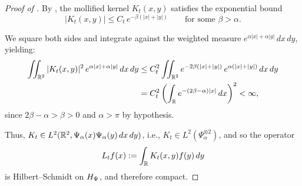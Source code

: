 \begin{proof}[Proof of ]
By , the mollified kernel \( K_t(x,y) \) satisfies the exponential bound
\[
|K_t(x,y)| \leq C_t \, e^{-\beta(|x| + |y|)} \qquad \text{for some } \beta > \alpha.
\]

We square both sides and integrate against the weighted measure \( e^{\alpha|x| + \alpha|y|}\, dx\, dy \), yielding:
\[
\begin{aligned}
\iint_{\mathbb{R}^2} |K_t(x,y)|^2\, e^{\alpha|x| + \alpha|y|}\, dx\, dy
&\le C_t^2 \iint_{\mathbb{R}^2} e^{-2\beta(|x| + |y|)}\, e^{\alpha(|x| + |y|)}\, dx\, dy \\
&= C_t^2 \left( \int_{\mathbb{R}} e^{-(2\beta - \alpha)|x|}\, dx \right)^2 < \infty,
\end{aligned}
\]
since \( 2\beta - \alpha > \beta > 0 \) and \( \alpha > \pi \) by hypothesis.

\medskip
\noindent
Thus, \( K_t \in L^2(\mathbb{R}^2, \Psi_\alpha(x)\Psi_\alpha(y)\, dx\, dy) \), i.e., \( K_t \in L^2(\Psi_\alpha^{\otimes 2}) \), and so the operator
\[
L_t f(x) := \int_{\mathbb{R}} K_t(x,y) f(y)\, dy
\]
is Hilbert--Schmidt on \( H_{\Psi} \), and therefore compact.
\end{proof}
